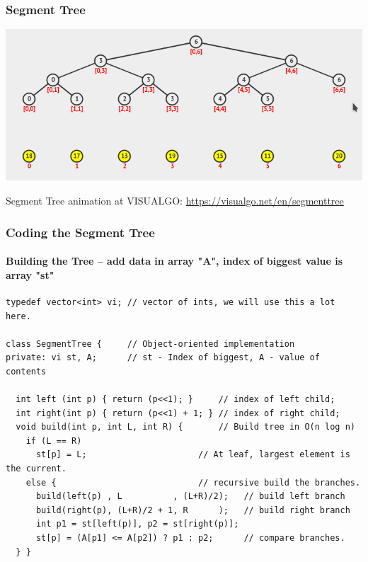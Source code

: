\begin{frame}
  \frametitle{Segment Tree}
  \begin{center}
    \includegraphics[width=1\textwidth]{img/segment_tree}
  \end{center}

  \bigskip

  Segment Tree animation at VISUALGO: \url{https://visualgo.net/en/segmenttree}
\end{frame}

\begin{frame}[fragile]
  \frametitle{Coding the Segment Tree}
  \framesubtitle{Building the Tree -- add data in array "A", index of biggest value is array "st"}
{\smaller
\begin{block}{}
\begin{verbatim}
typedef vector<int> vi; // vector of ints, we will use this a lot here.

class SegmentTree {     // Object-oriented implementation
private: vi st, A;      // st - Index of biggest, A - value of contents

  int left (int p) { return (p<<1); }     // index of left child;
  int right(int p) { return (p<<1) + 1; } // index of right child;
  void build(int p, int L, int R) {       // Build tree in O(n log n)
    if (L == R)
      st[p] = L;                      // At leaf, largest element is the current.
    else {                            // recursive build the branches.
      build(left(p) , L          , (L+R)/2);   // build left branch
      build(right(p), (L+R)/2 + 1, R      );   // build right branch
      int p1 = st[left(p)], p2 = st[right(p)];
      st[p] = (A[p1] <= A[p2]) ? p1 : p2;      // compare branches.
  } }
\end{verbatim}
\end{block}}

\end{frame}

